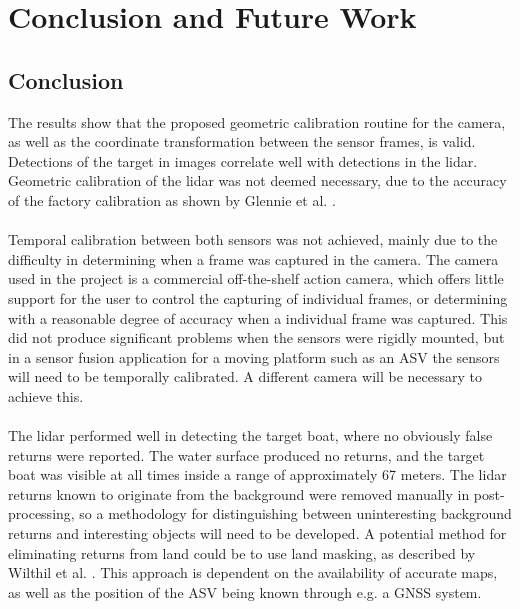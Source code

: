 
\chapter{Conclusion and Future Work}
\section{Conclusion}
The results show that the proposed geometric calibration routine for the camera, as well as the coordinate transformation between the sensor frames, is valid. Detections of the target in images correlate well with detections in the lidar. Geometric calibration of the lidar was not deemed necessary, due to the accuracy of the factory calibration as shown by Glennie et al. \cite{GlennieVLP}.\\
\vspace{1mm}\\
\noindent Temporal calibration between both sensors was not achieved, mainly due to the difficulty in determining when a frame was captured in the camera. The camera used in the project is a commercial off-the-shelf action camera, which offers little support for the user to control the capturing of individual frames, or determining with a reasonable degree of accuracy when a individual frame was captured. This did not produce significant problems when the sensors were rigidly mounted, but in a sensor fusion application for a moving platform such as an ASV the sensors will need to be temporally calibrated. A different camera will be necessary to achieve this.\\ \vspace{1mm}\\
The lidar performed well in detecting the target boat, where no obviously false returns were reported. The water surface produced no returns, and the target boat was visible at all times inside a range of approximately 67 meters. The lidar returns known to originate from the background were removed manually in post-processing, so a methodology for distinguishing between uninteresting background returns and interesting objects will need to be developed. A potential method for eliminating returns from land could be to use land masking, as described by Wilthil et al. \cite{Wilthil2017}. This approach is dependent on the availability of accurate maps, as well as the position of the ASV being known through e.g. a GNSS system.
\\\vspace{1mm}\\
